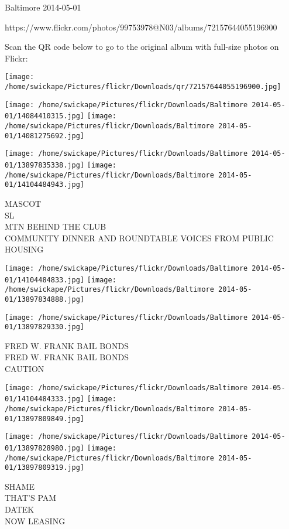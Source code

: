 \documentclass[10pt,letterpaper]{article}
\begin{document}
Baltimore 2014-05-01

https://www.flickr.com/photos/99753978@N03/albums/72157644055196900

Scan the QR code below to go to the original album with full-size photos on Flickr:

\texttt{[image: /home/swickape/Pictures/flickr/Downloads/qr/72157644055196900.jpg]}
\pagebreak

\texttt{[image: /home/swickape/Pictures/flickr/Downloads/Baltimore 2014-05-01/14084410315.jpg]}
\texttt{[image: /home/swickape/Pictures/flickr/Downloads/Baltimore 2014-05-01/14081275692.jpg]}

\texttt{[image: /home/swickape/Pictures/flickr/Downloads/Baltimore 2014-05-01/13897835338.jpg]}
\texttt{[image: /home/swickape/Pictures/flickr/Downloads/Baltimore 2014-05-01/14104484943.jpg]}

MASCOT\\
SL\\
MTN BEHIND THE CLUB\\
COMMUNITY DINNER AND ROUNDTABLE VOICES FROM PUBLIC HOUSING
\pagebreak

\texttt{[image: /home/swickape/Pictures/flickr/Downloads/Baltimore 2014-05-01/14104484833.jpg]}
\texttt{[image: /home/swickape/Pictures/flickr/Downloads/Baltimore 2014-05-01/13897834888.jpg]}

\vspace{0.25in}
\texttt{[image: /home/swickape/Pictures/flickr/Downloads/Baltimore 2014-05-01/13897829330.jpg]}

FRED W. FRANK BAIL BONDS\\
FRED W. FRANK BAIL BONDS\\
CAUTION
\pagebreak

\texttt{[image: /home/swickape/Pictures/flickr/Downloads/Baltimore 2014-05-01/14104484333.jpg]}
\texttt{[image: /home/swickape/Pictures/flickr/Downloads/Baltimore 2014-05-01/13897809849.jpg]}

\texttt{[image: /home/swickape/Pictures/flickr/Downloads/Baltimore 2014-05-01/13897828980.jpg]}
\texttt{[image: /home/swickape/Pictures/flickr/Downloads/Baltimore 2014-05-01/13897809319.jpg]}

SHAME\\
THAT'S PAM\\
DATEK\\
NOW LEASING
\pagebreak
\end{document}
